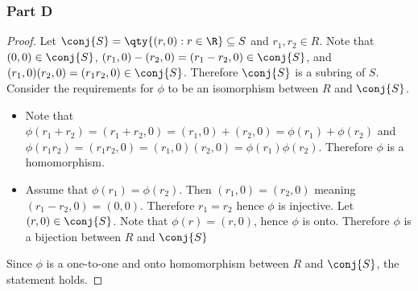 \documentclass[12pt,titlepage]{extarticle}
\begin{document}
\subsubsection*{Part D}
\begin{proof}
    Let $\conj{S} = \qty{(r,0) : r \in \R} \subseteq S$ and $r_1, r_2 \in R$. Note that $(0,0) \in \conj{S}$, $(r_1, 0) - (r_2, 0) = (r_1 - r_2, 0) \in \conj{S}$, and $(r_1, 0)(r_2, 0) = (r_1r_2, 0) \in \conj{S}$. Therefore $\conj{S}$ is a subring of $S$. Consider the requirements for $\phi$ to be an isomorphism between $R$ and $\conj{S}$.
    \begin{itemize}
        \item
            Note that $\phi(r_1 + r_2) = (r_1 + r_2, 0) = (r_1, 0) + (r_2, 0) = \phi(r_1) + \phi(r_2)$ and $\phi(r_1 r_2) = (r_1 r_2, 0) = (r_1, 0) (r_2, 0) = \phi(r_1) \phi(r_2)$. Therefore $\phi$ is a homomorphism.
        \item
            Assume that $\phi(r_1) = \phi(r_2)$. Then $(r_1, 0) = (r_2, 0)$ meaning $(r_1 - r_2, 0) = (0, 0)$. Therefore $r_1 = r_2$ hence $\phi$ is injective. Let $(r, 0) \in \conj{S}$. Note that $\phi(r) = (r,0)$, hence $\phi$ is onto. Therefore $\phi$ is a bijection between $R$ and $\conj{S}$
    \end{itemize}
    Since $\phi$ is a one-to-one and onto homomorphism between $R$ and $\conj{S}$, the statement holds.
\end{proof}
\end{document}

